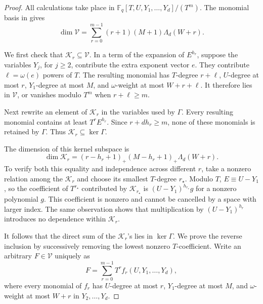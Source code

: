 \documentclass[11pt,letterpaper]{article}
\theoremstyle{definition}
\newcommand{\F}{\mathbb{F}}
\newcommand{\positive}[1]{\left(#1\right)_{+}}
\begin{document}
\begin{proof}
All calculations take place in
\(\F_q[T,U,Y_1,\ldots,Y_d]/(T^m)\).  The monomial basis in
 gives
\begin{equation}
  \dim\mathcal V
  =
  \sum_{r=0}^{m-1}(r+1)(M+1)\Lambda_d(W+r).
  \label{eq:dimension-v}
\end{equation}

We first check that \(\mathcal K_r\subseteq\mathcal V\).  In a term of the expansion of
\(E^{h_r}\), suppose the variables \(Y_j\), for \(j\geq 2\), contribute the
extra exponent vector \(e\).  They contribute
\(\ell=\omega(e)\) powers of \(T\).  The resulting monomial has \(T\)-degree
\(r+\ell\), \(U\)-degree at most \(r\), \(Y_1\)-degree at most \(M\), and
\(\omega\)-weight at most \(W+r+\ell\).  It therefore lies in \(\mathcal V\),
or vanishes modulo \(T^m\) when \(r+\ell\geq m\).

Next rewrite an element of \(\mathcal K_r\) in the variables used by
\(\Gamma\).  Every resulting monomial contains at least \(T^rE^{h_r}\).
Since \(r+dh_r\geq m\), none of these monomials is retained by \(\Gamma\).
Thus \(\mathcal K_r\subseteq\ker\Gamma\).

The dimension of this kernel subspace is
\begin{equation}
  \dim\mathcal K_r
  =
  \positive{r-h_r+1}\positive{M-h_r+1}\Lambda_d(W+r).
  \label{eq:dimension-kr}
\end{equation}
To verify both this equality and independence across different \(r\), take a
nonzero relation among the \(\mathcal K_r\) and choose its smallest
\(T\)-degree \(r_\star\).  Modulo \(T\),
\(E\equiv U-Y_1\), so the coefficient of \(T^{r_\star}\) contributed by
\(\mathcal K_{r_\star}\) is \((U-Y_1)^{h_{r_\star}}g\) for a nonzero
polynomial \(g\).  This coefficient is nonzero and cannot be cancelled by a
space with larger index.  The same observation shows that multiplication by
\((U-Y_1)^{h_r}\) introduces no dependence within \(\mathcal K_r\).

It follows that the direct sum of the \(\mathcal K_r\)'s lies in
\(\ker\Gamma\).  We prove the reverse inclusion by successively removing
the lowest nonzero \(T\)-coefficient.  Write an arbitrary
\(F\in\mathcal V\) uniquely as
\begin{equation}
  F=\sum_{r=0}^{m-1}T^rf_r(U,Y_1,\ldots,Y_d),
  \label{eq:gamma-t-adic-expansion}
\end{equation}
where every monomial of \(f_r\) has \(U\)-degree at most \(r\),
\(Y_1\)-degree at most \(M\), and \(\omega\)-weight at most \(W+r\) in
\(Y_2,\ldots,Y_d\).


\end{proof}
\end{document}
